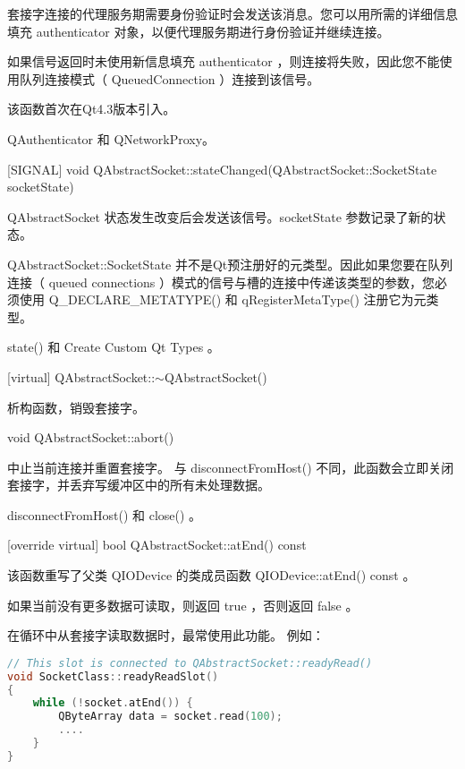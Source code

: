 套接字连接的代理服务期需要身份验证时会发送该消息。您可以用所需的详细信息填充 authenticator 对象，以便代理服务期进行身份验证并继续连接。


\begin{notice}
如果信号返回时未使用新信息填充 authenticator ，则连接将失败，因此您不能使用队列连接模式（ QueuedConnection ）连接到该信号。
\end{notice}


该函数首次在Qt4.3版本引入。

\begin{notice}[另请查阅]
QAuthenticator 和 QNetworkProxy。
\end{notice}

[SIGNAL] void
QAbstractSocket::stateChanged(QAbstractSocket::SocketState
socketState)

QAbstractSocket 状态发生改变后会发送该信号。socketState 参数记录了新的状态。

\begin{notice}
QAbstractSocket::SocketState 并不是Qt预注册好的元类型。因此如果您要在队列连接（ queued connections ）模式的信号与槽的连接中传递该类型的参数，您必须使用 Q\_DECLARE\_METATYPE() 和 qRegisterMetaType() 注册它为元类型。
\end{notice}


\begin{notice}[另请查阅]
state() 和 Create Custom Qt Types 。
\end{notice}


[virtual] QAbstractSocket::$\sim$QAbstractSocket()

析构函数，销毁套接字。

void QAbstractSocket::abort()

中止当前连接并重置套接字。 与 disconnectFromHost() 不同，此函数会立即关闭套接字，并丢弃写缓冲区中的所有未处理数据。



\begin{notice}[另请查阅]
 disconnectFromHost() 和 close() 。
\end{notice}



[override virtual] bool QAbstractSocket::atEnd() const

该函数重写了父类 QIODevice 的类成员函数 QIODevice::atEnd() const 。

如果当前没有更多数据可读取，则返回 true ，否则返回 false 。

在循环中从套接字读取数据时，最常使用此功能。 例如：

\begin{lstlisting}[language=C++]
// This slot is connected to QAbstractSocket::readyRead()
void SocketClass::readyReadSlot()
{
	while (!socket.atEnd()) {
		QByteArray data = socket.read(100);
		....
	}
}
\end{lstlisting}



